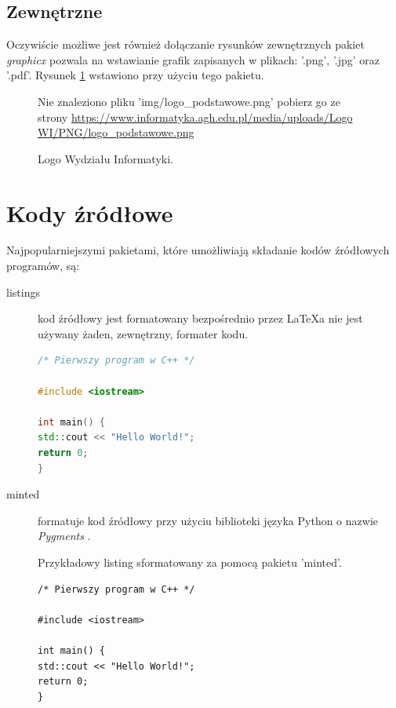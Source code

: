 \documentclass[data-science]{agh-wi} %
\begin{document}
\subsection{Zewnętrzne}
Oczywiście możliwe jest również dołączanie rysunków zewnętrznych \pauza
pakiet \emph{graphicx} \cite{graphicx} pozwala na wstawianie grafik zapisanych w  plikach: '.png', '.jpg' oraz '.pdf'. Rysunek \ref{fig:logo} wstawiono przy użyciu tego pakietu.
\begin{figure}[!ht]
    \begin{center}
        {Nie znaleziono pliku 'img/logo\_podstawowe.png' \pauza pobierz go ze strony \url{https://www.informatyka.agh.edu.pl/media/uploads/Logo WI/PNG/logo_podstawowe.png}}
    \end{center}
    \caption{Logo Wydziału Informatyki.}
    \label{fig:logo}
\end{figure}
\section{Kody źródłowe}
Najpopularniejszymi pakietami, które umożliwiają składanie kodów źródłowych programów, są:
\begin{description}
    \item[listings \cite{listings}] \pauza kod źródłowy jest formatowany bezpośrednio przez \LaTeX{}\dywiz{}a \pauza nie jest używany żaden, zewnętrzny, formater kodu.
        \begin{lstlisting}[language=C++, float=ht, label=lst:code1, caption={Przykładowy kod źródłowy sformatowany za pomocą pakietu 'listings'.}]
/* Pierwszy program w C++ */

#include <iostream>

int main() {
std::cout << "Hello World!";
return 0;
}
\end{lstlisting}
    \item[minted \cite{minted}] \pauza formatuje kod źródłowy przy użyciu biblioteki języka Python  o nazwie \emph{Pygments} \cite{pygments}.
        \begin{listing}[!ht]
            \caption{Przykładowy listing sformatowany za pomocą pakietu 'minted'.\label{lst:code2}}
            \begin{verbatim}
/* Pierwszy program w C++ */

#include <iostream>

int main() {
std::cout << "Hello World!";
return 0;
}
\end{verbatim}
        \end{listing}
\end{description}
\end{document}
